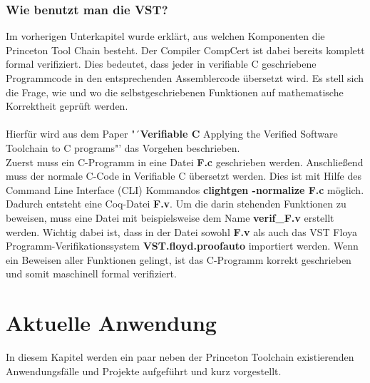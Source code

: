 \subsubsection{Wie benutzt man die VST?}
Im vorherigen Unterkapitel wurde erklärt, aus welchen Komponenten die Princeton Tool Chain besteht. Der Compiler CompCert ist dabei bereits komplett formal verifiziert. Dies bedeutet, dass jeder in verifiable C geschriebene Programmcode in den entsprechenden Assemblercode übersetzt wird. Es stell sich die Frage, wie und wo die selbstgeschriebenen Funktionen auf mathematische Korrektheit geprüft werden.\\
\\
{Hierfür wird aus dem Paper "´\textbf{Verifiable C} Applying the Verified Software Toolchain to C programs"' das Vorgehen beschrieben.\\
Zuerst muss ein C-Programm in eine Datei \textbf{F.c} geschrieben werden. Anschließend muss der normale C-Code in Verifiable C übersetzt werden. Dies ist mit Hilfe des Command Line Interface (CLI) Kommandos \textbf{clightgen -normalize F.c} möglich. Dadurch entsteht eine Coq-Datei \textbf{F.v}. Um die darin stehenden Funktionen zu beweisen, muss eine Datei mit beispielsweise dem Name \textbf{verif\_F.v} erstellt werden. Wichtig dabei ist, dass in der Datei sowohl \textbf{F.v} als auch das VST Floya Programm-Verifikationssystem \textbf{VST.floyd.proofauto} importiert werden. Wenn ein Beweisen aller Funktionen gelingt, ist das C-Programm korrekt geschrieben und somit maschinell formal verifiziert.}\cite{Appel01:VST}


\section{Aktuelle Anwendung}
\label{s:current-usage}
In diesem Kapitel werden ein paar neben der Princeton Toolchain existierenden Anwendungsfälle und Projekte aufgeführt und kurz vorgestellt.

